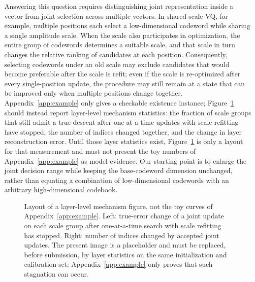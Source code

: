 Answering this question requires distinguishing joint representation inside a vector from joint selection across multiple vectors.
In shared-scale VQ, for example, multiple positions each select a low-dimensional codeword while sharing a single amplitude scale.
When the scale also participates in optimization, the entire group of codewords determines a suitable scale, and that scale in turn changes the relative ranking of candidates at each position.
Consequently, selecting codewords under an old scale may exclude candidates that would become preferable after the scale is refit; even if the scale is re-optimized after every single-position update, the procedure may still remain at a state that can be improved only when multiple positions change together.
Appendix~\ref{app:example} only gives a checkable existence instance; Figure~\ref{fig:motivation} should instead report layer-level mechanism statistics: the fraction of scale groups that still admit a true descent after one-at-a-time updates with scale refitting have stopped, the number of indices changed together, and the change in layer reconstruction error.
Until those layer statistics exist, Figure~\ref{fig:motivation} is only a layout for that measurement and must not present the toy numbers of Appendix~\ref{app:example} as model evidence.
Our starting point is to enlarge the joint decision range while keeping the base-codeword dimension unchanged, rather than equating a combination of low-dimensional codewords with an arbitrary high-dimensional codebook.

\begin{figure}[t]
\centering
{}
\caption{
Layout of a layer-level mechanism figure, not the toy curves of Appendix~\ref{app:example}.
Left: true-error change of a joint update on each scale group after one-at-a-time search with scale refitting has stopped.
Right: number of indices changed by accepted joint updates.
The present image is a placeholder and must be replaced, before submission, by layer statistics on the same initialization and calibration set; Appendix~\ref{app:example} only proves that such stagnation can occur.
}
\label{fig:motivation}
\end{figure}

